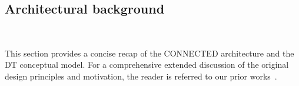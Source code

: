 \subsection{Architectural background}~\label{sec:paper6_architectural_background}

This section provides a concise recap of the CONNECTED architecture and the DT conceptual model. For a comprehensive extended discussion of the original design principles and motivation, the reader is referred to our prior works~\cite{10.3389/fdgth.2023.1322428_carbonaro_connected,marfoglia_connected_2025}.

